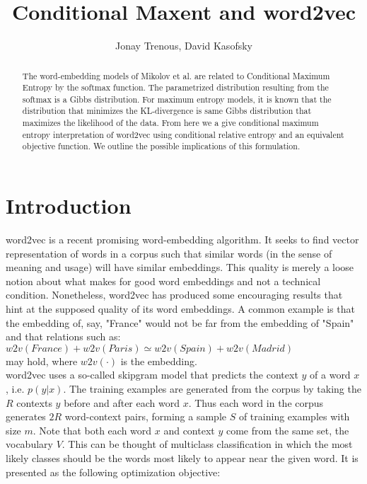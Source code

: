 \documentclass[]{article}
\title{Conditional Maxent and word2vec}
\author{Jonay Trenous, David Kasofsky}
\begin{document}
\maketitle

\begin{abstract}

\noindent The word-embedding models of Mikolov et al.\cite{word2vec1}\cite{word2vec2} are related to Conditional Maximum Entropy by the softmax function. The parametrized distribution resulting from the softmax is a Gibbs distribution. For maximum entropy models, it is known that the distribution that minimizes the KL-divergence is same Gibbs distribution that maximizes the likelihood of the data. From here we a give conditional maximum entropy interpretation of word2vec using conditional relative entropy and an equivalent objective function. We outline the possible implications of this formulation.

\end{abstract}

\section{Introduction}

word2vec\cite{word2vec1}\cite{word2vec2} is a recent promising word-embedding algorithm. It seeks to find vector representation of words in a corpus such that similar words (in the sense of meaning and usage) will have similar embeddings. This quality is merely a loose notion about what makes for good word embeddings and not a technical condition. Nonetheless, word2vec has produced some encouraging results that hint at the supposed quality of its word embeddings. A common example is that the embedding of, say, "France" would not be far from the embedding of "Spain" and that relations such as:\\

$w2v(France) + w2v(Paris) \simeq w2v(Spain) + w2v(Madrid)$\\

\noindent may hold, where $w2v(\cdot)$ is the embedding.\\

word2vec uses a so-called skipgram model that predicts the context $y$ of a word $x$, i.e. $p(y|x)$. The training examples are generated from the corpus by taking the $R$ contexts $y$ before and after each word $x$. Thus each word in the corpus generates $2R$ word-context pairs, forming a sample $S$ of training examples with size $m$. Note that both each word $x$ and context $y$ come from the same set, the vocabulary $V$. This can be thought of multiclass classification in which the most likely classes should be the words most likely to appear near the given word. It is presented as the following optimization objective:\\
\end{document}
